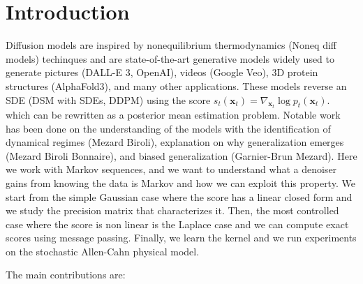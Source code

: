 \documentclass{article}
\begin{document}
\section{Introduction}
\label{sec:intro}




Diffusion models are inspired by nonequilibrium thermodynamics (Noneq diff models) techinques and are state-of-the-art generative models widely used to generate pictures (DALL-E 3, OpenAI), videos (Google Veo), 3D protein structures (AlphaFold3), and many other applications. These models reverse an SDE (DSM with SDEs, DDPM) using the score $s_t(\mathbf{x}_t)
=
\nabla_{\mathbf{x}_t}
\log p_t(\mathbf{x}_t).$ which can be rewritten as a posterior mean estimation problem. Notable work has been done on the understanding of the models with the identification of dynamical regimes (Mezard Biroli), explanation on why generalization emerges (Mezard Biroli Bonnaire), and biased generalization (Garnier-Brun Mezard). 
Here we work with Markov sequences, and we want to understand what a denoiser gains from knowing the data is Markov and how we can exploit this property.
We start from the simple Gaussian case where the score has a linear closed form and we study the precision matrix that characterizes it. Then, the most controlled case where the score is non linear is the Laplace case and we can compute exact scores using message passing. Finally, we learn the kernel and we run experiments on the stochastic Allen-Cahn physical model.

The main contributions are:
\end{document}

